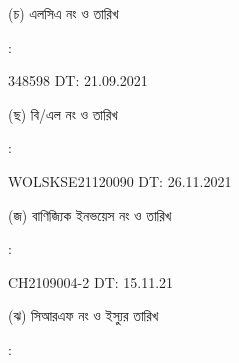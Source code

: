 \documentclass[12pt]{article}
\newcommand{\blno}{WOLSKSE21120090}
\newcommand{\bldt}{26.11.2021}
\newcommand{\lcdt}{21.09.2021}
\newcommand{\lcano}{348598}
\newcommand{\lcadt}{\lcdt}
\newcommand{\invno}{CH2109004-2}
\newcommand{\invdt}{15.11.21}
\begin{document}
\begin{minipage}[t]{0.05\linewidth}
\hspace*{1em}
\end{minipage}
\begin{minipage}[t]{0.40\linewidth}
(চ) এলসিএ নং ও তারিখ
\end{minipage}
\begin{minipage}[t]{0.02\linewidth}
:
\end{minipage}
\begin{minipage}[t]{0.53\linewidth}
{\lcano} \hspace{2em} DT: {\lcadt}
\\
\end{minipage}
\begin{minipage}[t]{0.05\linewidth}
\hspace*{1em}
\end{minipage}
\begin{minipage}[t]{0.40\linewidth}
(ছ) বি/এল নং ও তারিখ
\end{minipage}
\begin{minipage}[t]{0.02\linewidth}
:
\end{minipage}
\begin{minipage}[t]{0.53\linewidth}
{\blno} \hspace{2em} DT: {\bldt}
\\
\end{minipage}
\begin{minipage}[t]{0.05\linewidth}
\hspace*{1em}
\end{minipage}
\begin{minipage}[t]{0.40\linewidth}
(জ) বাণিজ্যিক ইনভয়েস নং ও তারিখ
\end{minipage}
\begin{minipage}[t]{0.02\linewidth}
:
\end{minipage}
\begin{minipage}[t]{0.53\linewidth}
{\invno} \hspace{2em} DT: {\invdt}
\\
\end{minipage}
\begin{minipage}[t]{0.05\linewidth}
\hspace*{1em}
\end{minipage}
\begin{minipage}[t]{0.40\linewidth}
(ঝ) সিআরএফ নং ও ইস্যুর তারিখ
\end{minipage}
\begin{minipage}[t]{0.02\linewidth}
:
\end{minipage}
\end{document}
